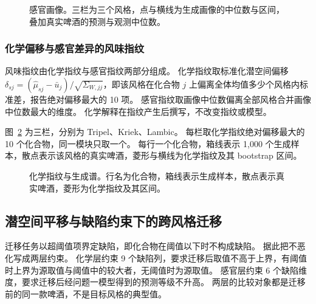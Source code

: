\begin{figure}[H]\centering
{}
\caption{感官画像。三栏为三个风格，点与横线为生成画像的中位数与区间，叠加真实啤酒的预测与观测中位数。}
\label{fig:q3-portrait}
\end{figure}

\subsubsection{化学偏移与感官差异的风味指纹}

风味指纹由化学指纹与感官指纹两部分组成。
化学指纹取标准化潜空间偏移 $\delta_{sj}=(\hat\mu_{sj}-\bar u_j)/\sqrt{\Sigma_{W,jj}}$，即该风格在化合物 $j$ 上偏离全体均值多少个风格内标准差，报告绝对偏移最大的 10 项。
感官指纹取画像中位数偏离全部风格合并画像中位数最大的维度。
化学解释在指纹产生后撰写，不改变指纹或模型。

图~\ref{fig:q3-fingerprint} 为三栏，分别为 Tripel、Kriek、Lambic。
每栏取化学指纹绝对偏移最大的 10 个化合物，同一模块只取一个。
每行一个化合物，箱线表示 1,000 个生成样本，散点表示该风格的真实啤酒，菱形与横线为化学指纹及其 bootstrap 区间。

\begin{figure}[H]\centering
{}
\caption{化学指纹与生成谱。行名为化合物，箱线表示生成样本，散点表示真实啤酒，菱形为化学指纹及其区间。}
\label{fig:q3-fingerprint}
\end{figure}

\subsection{潜空间平移与缺陷约束下的跨风格迁移}

迁移任务以超阈值项界定缺陷，即化合物在阈值以下时不构成缺陷。
据此把不恶化写成两层约束。
化学层约束 9 个缺陷列，要求迁移后取值不高于上界，有阈值时上界为源取值与阈值中的较大者，无阈值时为源取值。
感官层约束 6 个缺陷维度，要求迁移后经问题一模型得到的预测等级不升高。
两层的比较对象都是迁移前的同一款啤酒，不是目标风格的典型值。

